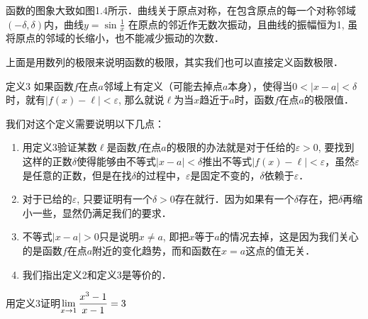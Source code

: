 函数的图象大致如图1.4所示．曲线关于原点对称，在包含原点的每一个对称邻域$(-\delta, \delta)$内，曲线$y=\sin\frac{1}{x}$
在原点的邻近作无数次振动，且曲线的振幅恒为1, 虽将原点的邻域的长缩小，也不能减少振动的次数．

\begin{figure}[htp]
    \centering
{}    
    \caption{}
\end{figure}

上面是用数列的极限来说明函数的极限，其实我们也可以直接定义函数极限．

\begin{blk}{定义3}
  如果函数$f$在点$a$邻域上有定义（可能去掉点$a$本身），使得当$0<|x-a|<\delta$时，就有$|f(x)-\ell|<\varepsilon$, 那么就说$\ell$为当$x$趋近于$a$时，函数$f$在点$a$的极限值．
\end{blk}

我们对这个定义需要说明以下几点：
\begin{enumerate}
    \item 用定义3验证某数$\ell$是函数$f$在点$a$的极限的办法就是对于任给的$\varepsilon>0$, 要找到这样的正数$\delta$使得能够由不等式$|x-a|<\delta$推出不等式$|f(x)-\ell|<\varepsilon$，虽然$\varepsilon$是任意的正数，但是在找$\delta$的过程中，$\varepsilon$是固定不变的，$\delta$依赖于$\varepsilon$．
    \item 对于已给的$\varepsilon$, 只要证明有一个$\delta>0$存在就行．因为如果有一个$\delta$存在，把$\delta$再缩小一些，显然仍满足我们的要求．
    \item 不等式$|x-a|>0$只是说明$x\ne a$, 即把$x$等于$a$的情况去掉，这是因为我们关心的是函数$f$在点$a$附近的变化趋势，而和函数在$x=a$这点的值无关．
    \item 我们指出定义2和定义3是等价的．
\end{enumerate}

\begin{example}
用定义3证明$\displaystyle\lim_{x\to 1}\dfrac{x^3-1}{x-1}=3$
\end{example}

